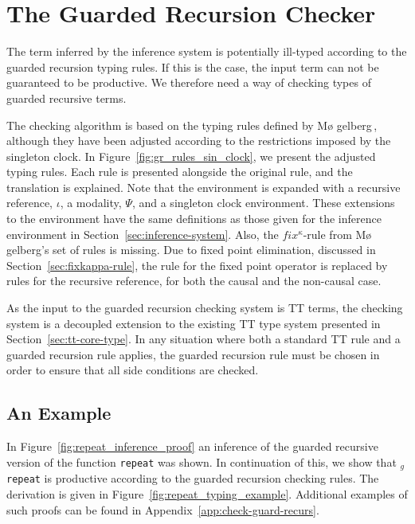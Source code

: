 \section{The Guarded Recursion Checker}
\label{sec:guard-recurs-check}
The term inferred by the inference system is potentially ill-typed according to the
guarded recursion typing rules. If this is the case, the input term can not be
guaranteed to be productive. We therefore need a way of checking types of
guarded recursive terms.

The checking algorithm is based on the typing rules defined by M\o
gelberg\,\citep{Mogelberg:2014}, although they have been adjusted according to
the restrictions imposed by the singleton clock. In Figure~\ref{fig:gr_rules_sin_clock}, we
present the adjusted typing rules. Each rule is presented alongside the original
rule, and the translation is explained. Note that the
environment is expanded with a recursive reference, $\iota$, a modality, $\Psi$,
and a singleton clock environment. These extensions to the environment 
have the same definitions as those given for the inference environment in
Section~\ref{sec:inference-system}. Also, the $fix^\kappa$-rule from M\o
gelberg's set of rules is missing. Due to fixed point elimination, discussed in
Section~\ref{sec:fixkappa-rule}, the rule for the fixed point operator is
replaced by rules for the recursive reference, for both the causal and the non-causal case.

As the input to the guarded recursion checking system is TT terms, the checking system is a
decoupled extension to the existing TT type system presented in Section~\ref{sec:tt-core-type}. In any situation where
both a standard TT rule and a guarded recursion rule applies, the guarded
recursion rule must be chosen in order to ensure that all side conditions are checked.



\subsection{An Example}
In Figure~\ref{fig:repeat_inference_proof} an inference of the guarded recursive
version of the function \texttt{repeat} was shown. In continuation of this, we
show that $_g$\texttt{repeat} is productive according to the guarded recursion
checking rules. The derivation is given in Figure~\ref{fig:repeat_typing_example}. Additional examples of such proofs can be found in Appendix~\ref{app:check-guard-recurs}.


